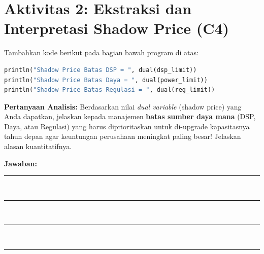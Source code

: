 \documentclass[11pt, a4paper]{article}
\begin{document}
\section*{Aktivitas 2: Ekstraksi dan Interpretasi Shadow Price (C4)}
Tambahkan kode berikut pada bagian bawah program di atas:
\begin{lstlisting}[language=Python]
println("Shadow Price Batas DSP = ", dual(dsp_limit))
println("Shadow Price Batas Daya = ", dual(power_limit))
println("Shadow Price Batas Regulasi = ", dual(reg_limit))
\end{lstlisting}

\textbf{Pertanyaan Analisis:}
Berdasarkan nilai \textit{dual variable} (shadow price) yang Anda dapatkan, jelaskan kepada manajemen \textbf{batas sumber daya mana} (DSP, Daya, atau Regulasi) yang harus diprioritaskan untuk di-upgrade kapasitasnya tahun depan agar keuntungan perusahaan meningkat paling besar! Jelaskan alasan kuantitatifnya.

\vspace{2cm}
\textbf{Jawaban:} \\
\rule{\textwidth}{0.4pt} \\
\rule{\textwidth}{0.4pt} \\
\rule{\textwidth}{0.4pt} \\
\rule{\textwidth}{0.4pt}
\end{document}
